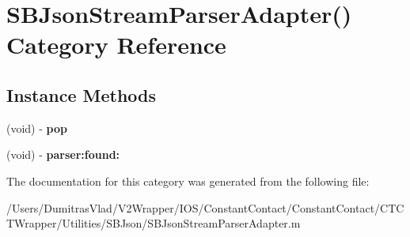 \hypertarget{category_s_b_json_stream_parser_adapter_07_08}{\section{S\-B\-Json\-Stream\-Parser\-Adapter() Category Reference}
\label{category_s_b_json_stream_parser_adapter_07_08}
}
\subsection*{Instance Methods}
\begin{DoxyCompactItemize}
\item 
\hypertarget{category_s_b_json_stream_parser_adapter_07_08_a3dc3665abef287573c9fad2a9eabb6b3}{(void) -\/ {\bfseries pop}}\label{category_s_b_json_stream_parser_adapter_07_08_a3dc3665abef287573c9fad2a9eabb6b3}

\item 
\hypertarget{category_s_b_json_stream_parser_adapter_07_08_af2059c2ce23ed04a633afe6d331291e0}{(void) -\/ {\bfseries parser\-:found\-:}}\label{category_s_b_json_stream_parser_adapter_07_08_af2059c2ce23ed04a633afe6d331291e0}

\end{DoxyCompactItemize}


The documentation for this category was generated from the following file\-:\begin{DoxyCompactItemize}
\item 
/\-Users/\-Dumitras\-Vlad/\-V2\-Wrapper/\-I\-O\-S/\-Constant\-Contact/\-Constant\-Contact/\-C\-T\-C\-T\-Wrapper/\-Utilities/\-S\-B\-Json/S\-B\-Json\-Stream\-Parser\-Adapter.\-m\end{DoxyCompactItemize}
